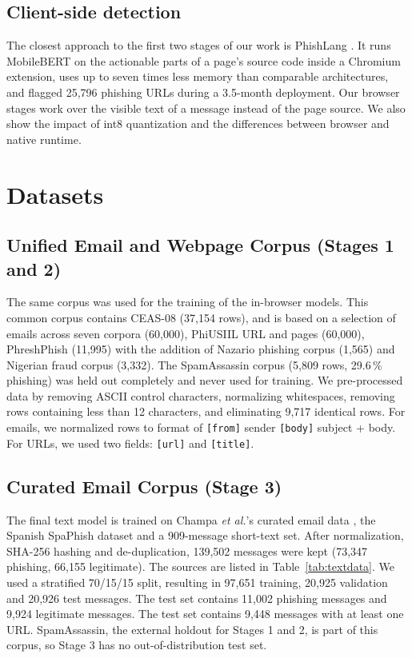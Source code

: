 \documentclass[conference]{IEEEtran}
\begin{document}
\subsection{Client-side detection}
The closest approach to the first two stages of our work is PhishLang \cite{roy2026phishlang}. It runs MobileBERT on the actionable parts of a page's source code inside a Chromium extension, uses up to seven times less memory than comparable architectures, and flagged 25,796 phishing URLs during a 3.5-month deployment. Our browser stages work over the visible text of a message instead of the page source. We also show the impact of int8 quantization and the differences between browser and native runtime.

\section{Datasets}\label{sec:datasets}
\subsection{Unified Email and Webpage Corpus (Stages 1 and 2)}
The same corpus was used for the training of the in-browser models. This common corpus contains CEAS-08 (37,154 rows), and is based on a selection of emails across seven corpora (60,000), PhiUSIIL URL and pages (60,000), PhreshPhish (11,995) \cite{dalton2025phreshphish} with the addition of Nazario phishing corpus (1,565) and Nigerian fraud corpus (3,332). The SpamAssassin corpus (5,809 rows, 29.6\,\% phishing) was held out completely and never used for training. We pre-processed data by removing ASCII control characters, normalizing whitespaces, removing rows containing less than 12 characters, and eliminating 9,717 identical rows. For emails, we normalized rows to format of \texttt{[from]} sender \texttt{[body]} subject + body. For URLs, we used two fields: \texttt{[url]} and \texttt{[title]}.

\subsection{Curated Email Corpus (Stage 3)}
The final text model is trained on Champa \emph{et al.}'s curated email data \cite{champa2024curated}, the Spanish SpaPhish dataset \cite{spaphish2025} and a 909-message short-text set. After normalization, SHA-256 hashing and de-duplication, 139,502 messages were kept (73,347 phishing, 66,155 legitimate). The sources are listed in Table~\ref{tab:textdata}. We used a stratified 70/15/15 split, resulting in 97,651 training, 20,925 validation and 20,926 test messages. The test set contains 11,002 phishing messages and 9,924 legitimate messages. The test set contains 9,448 messages with at least one URL. SpamAssassin, the external holdout for Stages 1 and 2, is part of this corpus, so Stage 3 has no out-of-distribution test set.
\end{document}
